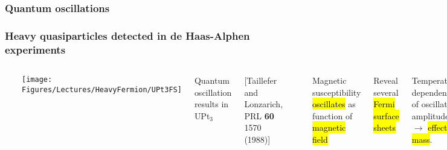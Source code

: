 \begin{frame}[label=QuantOsc]
\frametitle{Quantum oscillations}




\end{frame}

\begin{frame}[label=dHvA]
  \frametitle{Heavy quasiparticles detected in de Haas-Alphen experiments}
\vspace{-1em}
\begin{columns}[t]
\centerline{~}
\centerline{\texttt{[image: \\Figures/Lectures/HeavyFermion/UPt3FS]}}
\centerline{Quantum oscillation results in UPt$_3$}
\begin{center} 
\scriptsize [Taillefer and Lonzarich, PRL {\bf 60} 1570 (1988)]
\end{center}

\centerline{~}
\bi
\setlength{\itemsep}{1em}

\item
Magnetic susceptibility \hl{oscillates} as function of \hl{ magnetic field}

\item
Reveal several \hl{Fermi surface sheets}

\item
Temperature dependence of oscillation amplitude $\rightarrow$ \hl{effective mass}.

\item
Measured effective masses strongly renormalised, consistent with \hl{heat capacity results.}

\ei
{}
f-electrons included in Fermi surface volume!
\encbox
\end{columns}

\end{frame}


